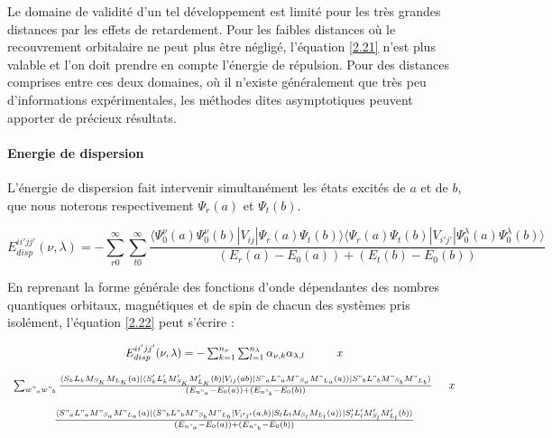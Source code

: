 \documentclass[12pt,a4paper]{book}
\begin{document}
	Le domaine de validité d'un tel développement est limité pour les très grandes distances par les effets de retardement. Pour les faibles distances où le recouvrement orbitalaire ne peut plus être négligé, l'équation \ref{2.21} n'est plus valable et l'on doit prendre en compte l'énergie de répulsion. Pour des distances comprises entre ces deux domaines, où il n'existe généralement que très peu d'informations expérimentales, les méthodes dites asymptotiques peuvent apporter de précieux résultats.
	
	
	\paragraph{Energie de dispersion}
	
	L'énergie de dispersion fait intervenir simultanément les états excités de $a$ et de $b$, que nous noterons respectivement $\Psi_{r}(a)$ et $\Psi_{t}(b)$.
	
	\begin{equation}
	E_{disp}^{ii'jj'} (\nu , \lambda) = - \sum_{r0}^{\infty} \sum_{t0}^{\infty} \frac{\langle \Psi_{0}^{\nu} (a) \Psi_{0}^{\nu} (b)| V_{ij}|\Psi_{r} (a) \Psi_{t} (b) \rangle  \langle \Psi_{r} (a) \Psi_{t} (b) |V_{i'j'}| \Psi_{0}^{\lambda} (a) \Psi_{0}^{\lambda}(b) \rangle}{(E_{r} (a) - E_{0} (a)) + (E_{t} (b) - E_{0} (b))} \label{2.22}
	\end{equation}
	
	En reprenant la forme générale des fonctions d'onde dépendantes des nombres quantiques orbitaux, magnétiques et de spin de chacun des systèmes pris isolément, l'équation \ref{2.22} peut s'écrire : 
	
	\begin{equation}
	\begin{array}{c}
	E_{disp}^{ii'jj'} (\nu , \lambda) = - \sum_{k=1}^{n_{\nu}} \sum_{l=1}^{n_{\lambda}} \alpha_{\nu , k} \alpha_{\lambda , l} \hspace{1cm} x \\
	\\
	\sum_{w"_{a} w"_{b}} \frac{\langle S_{k} L_{k} M_{S_{K}} M_{L_{K}} (a) |\langle S'_{k} L'_{k} M'_{S_{K}} M'_{L_{K}} (b)| V_{ij} (ab) | S"_{a} L"_{a} M"_{S_{a}} M"_{L_{a}} (a)\rangle| S"_{b} L"_{b} M"_{S_{b}} M"_{L_{b}} \rangle}{(E_{n"_{a}} - E_{0}(a)) + (E_{n"_{b}} - E_{0}(b))} \hspace{0.5 cm} x \\
	\\
	\frac{\langle S"_{a} L"_{a} M"_{S_{a}} M"_{L_{a}} (a)| \langle S"_{b} L"_{b} M"_{S_{b}} M"_{L_{b}} | V_{i'j'}(a,b)| S_{l} L_{l} M_{S_{l}} M_{L_{l}} (a) \rangle | S'_{l} L'_{l} M'_{S_{l}} M'_{L_{l}} (b) \rangle}{(E_{n"_{a}} - E_{0} (a)) + (E_{n"_{b}} - E_{0}(b))}
	\end{array}
	\end{equation}
	
\end{document}
